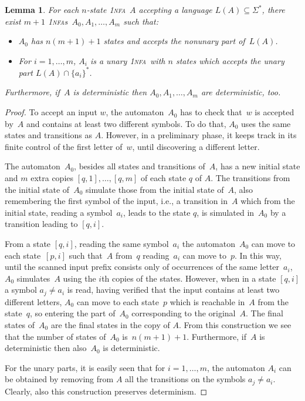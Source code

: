 \documentclass[11pt]{article}
\newcommand*{\ow}{\textsc{1}}
\newcommand*{\ownfa}{\ow\textsc{nfa}}
\newcommand*{\ownfas}{\ow\textsc{nfa}s}
\newtheorem{lemma}[theorem]{Lemma}
\begin{document}
\begin{lemma}\label{lemma:decREG}
	For each $n$-state \ownfa~$A$ accepting a language $L(A)\subseteq\Sigma^*$,
	there exist $m+1$ \ownfas\ $A_0,A_1,\ldots,A_m$ such that:
	\begin{itemize}
	\item $A_0$ has $n(m+1)+1$ states and accepts the nonunary part of~$L(A)$.
	\item For $i=1,\ldots,m$, $A_i$ is a unary \ownfa\ with $n$ states which
	accepts the unary part $L(A)\cap\{a_i\}^*$.
	\end{itemize}
	Furthermore, if~$A$ is deterministic then $A_0,A_1,\ldots,A_m$ are deterministic, too.
\end{lemma}
\begin{proof}
  To accept an input $w$, the automaton~$A_0$ has to check that~$w$ is accepted by~$A$ and contains
	at least two different symbols. To do that, $A_0$ uses the same states and transitions as $A$.
	However, in a preliminary phase, it keeps track in its finite control of the first letter of~$w$,
	until discovering a different letter.
	
	The automaton~$A_0$, besides all states and transitions of~$A$,
	has a new initial state and $m$ extra copies $[q,1],\ldots,[q,m]$ of each state $q$ of $A$.
	The transitions from the initial state of~$A_0$ simulate those from the initial state of~$A$, also remembering the
	first symbol of the input, i.e., a transition in~$A$ which from the initial state, reading a symbol~$a_i$,
	leads to the state $q$, is simulated in~$A_0$ by a transition leading to $[q,i]$.
  
  From a state $[q,i]$, reading the same symbol~$a_i$ the automaton~$A_0$ can move to each state~$[p,i]$
  such that~$A$ from~$q$ reading~$a_i$ can move to~$p$. In this way, until the scanned input prefix consists
  only of occurrences of the same letter~$a_i$, $A_0$ simulates~$A$ using the $i$th copies of the states.
  However, when in a state $[q,i]$ a symbol $a_j\neq a_i$ is read, having verified that the input contains at 
  least two different letters, $A_0$ can move to each state~$p$ which is reachable in~$A$ from the state~$q$,
  so entering the part of~$A_0$ corresponding to the original~$A$.
  The final states of~$A_0$ are the final states in the copy of $A$.
  From this construction we see that the number of states of~$A_0$ is~$n(m+1)+1$.
  Furthermore, if~$A$ is deterministic then also~$A_0$ is deterministic.
    
 
\smallskip

	For the unary parts, it is easily seen that for $i=1,\ldots,m$, the automaton $A_i$ can be obtained 
	by removing from $A$ all the transitions on the symbols $a_j\neq a_i$. Clearly, also this construction preserves
	determinism.
\end{proof}
\end{document}
